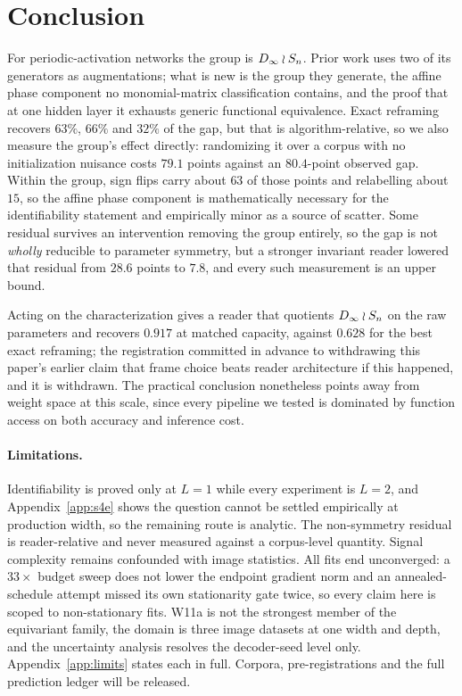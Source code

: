 \section{Conclusion}

For periodic-activation networks the group is $D_\infty\wr S_n$. Prior work uses two of its generators
as augmentations; what is new is the group they generate, the affine phase component no
monomial-matrix classification contains, and the proof that at one hidden layer it exhausts generic
functional equivalence. Exact reframing recovers $63\%$, $66\%$ and $32\%$ of the gap, but that is
algorithm-relative, so we also measure the group's effect directly: randomizing it over a corpus
with no initialization nuisance costs $79.1$ points against an $80.4$-point observed gap. Within the
group, sign flips carry about $63$ of those points and relabelling about $15$, so the affine phase
component is mathematically necessary for the identifiability statement and empirically minor as a
source of scatter. Some residual survives an intervention removing the group entirely, so the gap is
not \emph{wholly} reducible to parameter symmetry, but a stronger invariant reader lowered that
residual from $28.6$ points to $7.8$, and every such measurement is an upper bound.

Acting on the characterization gives a reader that quotients $D_\infty\wr S_n$ on the raw parameters
and recovers $0.917$ at matched capacity, against $0.628$ for the best exact reframing; the
registration committed in advance to withdrawing this paper's earlier claim that frame choice beats
reader architecture if this happened, and it is withdrawn. The practical conclusion nonetheless
points away from weight space at this scale, since every pipeline we tested is dominated by function
access on both accuracy and inference cost.

\paragraph{Limitations.} Identifiability is proved only at $L=1$ while every experiment is $L=2$,
and Appendix~\ref{app:s4e} shows the question cannot be settled empirically at production width, so
the remaining route is analytic. The non-symmetry residual is reader-relative and never measured
against a corpus-level quantity. Signal complexity remains confounded with image statistics. All
fits end unconverged: a $33\times$ budget sweep does not lower the endpoint gradient norm and an
annealed-schedule attempt missed its own stationarity gate twice, so every claim here is scoped to
non-stationary fits. W11a is not the strongest member of the equivariant family, the domain is three
image datasets at one width and depth, and the uncertainty analysis resolves the decoder-seed level
only. Appendix~\ref{app:limits} states each in full. Corpora, pre-registrations and the full
prediction ledger will be released.
